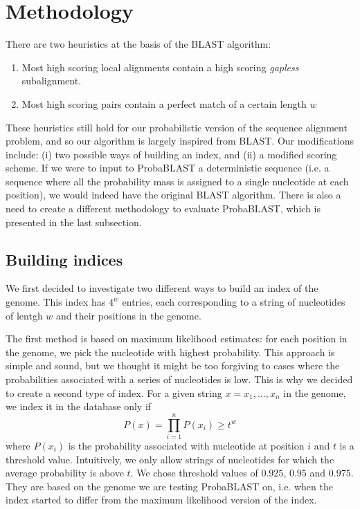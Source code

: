 \documentclass[10pt]{IEEEtran}
\begin{document}
\section{Methodology}

There are two heuristics at the basis of the BLAST algorithm:
\begin{enumerate}
\item Most high scoring local alignments contain a high scoring \emph{gapless} subalignment.
\item Most high scoring pairs contain a perfect match of a certain length $w$
\end{enumerate}
These heuristics still hold for our probabilistic version of the sequence alignment problem, and so our algorithm is largely inspired from BLAST. Our modifications include: (i) two possible ways of building an index, and (ii) a modified scoring scheme. If we were to input to ProbaBLAST a deterministic sequence (i.e. a sequence where all the probability mass is assigned to a single nucleotide at each position), we would indeed have the original BLAST algorithm. There is also a need to create a different methodology to evaluate ProbaBLAST, which is presented in the last subsection.

\subsection{Building indices}

We first decided to investigate two different ways to build an index of the genome. This index has $4^w$ entries, each corresponding to a string of nucleotides of lentgh $w$ and their positions in the genome.

The first method is based on maximum likelihood estimates: for each position in the genome, we pick the nucleotide with highest probability. This approach is simple and sound, but we thought it might be too forgiving to cases where the probabilities associated with a series of nucleotides is low.
This is why we decided to create a second type of index. For a given string $x=x_1,\dots,x_n$ in the genome, we index it in the database only if 
$$P(x)=\prod_{i=1}^{n}P(x_i)\geq t^w$$
where $P(x_i)$ is the probability associated with nucleotide at position $i$  and $t$ is a threshold value. Intuitively, we only allow strings of nucleotides for which the average probability is above $t$. We chose threshold values of $0.925$, $0.95$ and $0.975$. They are based on the genome we are testing ProbaBLAST on, i.e. when the index started to differ from the maximum likelihood version of the index.
\end{document}
